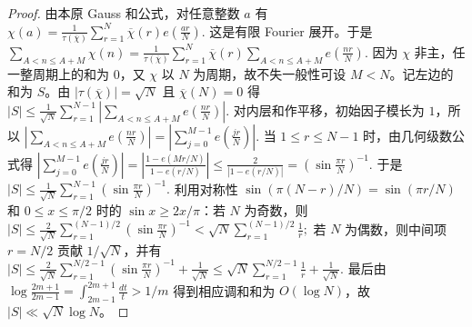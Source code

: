 \documentclass[oneside]{AJbook}
\begin{document}
\begin{proof}
由本原 Gauss 和公式，对任意整数 $a$ 有
\(
  \chi(a)
  =
  \frac1{\tau(\overline{\chi})}
  \sum_{r=1}^{N}\overline{\chi}(r)e\!\left(\frac{ar}{N}\right).
\)
这是有限 Fourier 展开。于是
\(
  \sum_{A<n\le A+M}\chi(n)
  =
  \frac1{\tau(\overline{\chi})}
  \sum_{r=1}^{N}\overline{\chi}(r)
  \sum_{A<n\le A+M}e\!\left(\frac{nr}{N}\right).
\)
因为 $\chi$ 非主，任一整周期上的和为 $0$，又 $\chi$ 以 $N$ 为周期，故不失一般性可设 $M<N$。记左边的和为 $S$。由 $|\tau(\overline{\chi})|=\sqrt N$ 且 $\overline{\chi}(N)=0$ 得
\(
  |S|
  \le
  \frac1{\sqrt N}
  \sum_{r=1}^{N-1}
  \left|
  \sum_{A<n\le A+M}e\!\left(\frac{nr}{N}\right)
  \right|.
\)
对内层和作平移，初始因子模长为 $1$，所以
\(
  \left|
  \sum_{A<n\le A+M}e\!\left(\frac{nr}{N}\right)
  \right|
  =
  \left|
  \sum_{j=0}^{M-1}e\!\left(\frac{jr}{N}\right)
  \right|.
\)
当 $1\le r\le N-1$ 时，由几何级数公式得
\(
  \left|
  \sum_{j=0}^{M-1}e\!\left(\frac{jr}{N}\right)
  \right|
  =
  \left|
  \frac{1-e(Mr/N)}{1-e(r/N)}
  \right|
  \le
  \frac2{|1-e(r/N)|}
  =
  \left(\sin\frac{\pi r}{N}\right)^{-1}.
\)
于是
\(
  |S|
  \le
  \frac1{\sqrt N}
  \sum_{r=1}^{N-1}
  \left(\sin\frac{\pi r}{N}\right)^{-1}.
\)
利用对称性 $\sin(\pi(N-r)/N)=\sin(\pi r/N)$ 和 $0\le x\le\pi/2$ 时的 $\sin x\ge 2x/\pi$：若 $N$ 为奇数，则
\(
  |S|
  \le
  \frac2{\sqrt N}
  \sum_{r=1}^{(N-1)/2}
  \left(\sin\frac{\pi r}{N}\right)^{-1}
  <
  \sqrt N
  \sum_{r=1}^{(N-1)/2}\frac1r;
\)
若 $N$ 为偶数，则中间项 $r=N/2$ 贡献 $1/\sqrt N$，并有
\(
  |S|
  \le
  \frac2{\sqrt N}
  \sum_{r=1}^{N/2-1}
  \left(\sin\frac{\pi r}{N}\right)^{-1}
  +
  \frac1{\sqrt N}
  \le
  \sqrt N
  \sum_{r=1}^{N/2-1}\frac1r
  +
  \frac1{\sqrt N}.
\)
最后由 $\log\frac{2m+1}{2m-1}=\int_{2m-1}^{2m+1}\frac{dt}{t}>1/m$ 得到相应调和和为 $O(\log N)$，故 $|S|\ll\sqrt N\log N$。
\end{proof}
\end{document}
